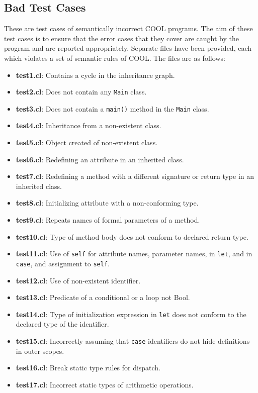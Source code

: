 \documentclass{article}
\begin{document}
\subsection{Bad Test Cases}
These are test cases of semantically incorrect COOL programs. The aim of these test cases is to ensure that the error cases that they cover are caught by the program and are reported appropriately. Separate files have been provided, each which violates a set of semantic rules of COOL. The files are as follows:
\begin{itemize}
	\item \textbf{test1.cl}: Contains a cycle in the inheritance graph.
	\item \textbf{test2.cl}: Does not contain any \verb|Main| class.
	\item \textbf{test3.cl}: Does not contain a \verb|main()| method in the \verb|Main| class.
	\item \textbf{test4.cl}: Inheritance from a non-existent class.
	\item \textbf{test5.cl}: Object created of non-existent class.
	\item \textbf{test6.cl}: Redefining an attribute in an inherited class.
	\item \textbf{test7.cl}: Redefining a method with a different signature or return type in an inherited class.
	\item \textbf{test8.cl}: Initializing attribute with a non-conforming type.
	\item \textbf{test9.cl}: Repeats names of formal parameters of a method.
	\item \textbf{test10.cl}: Type of method body does not conform to declared return type.
	\item \textbf{test11.cl}: Use of \verb|self| for attribute names, parameter names, in \verb|let|, and in \verb|case|, and assignment to \verb|self|.
	\item \textbf{test12.cl}: Use of non-existent identifier.
	\item \textbf{test13.cl}: Predicate of a conditional or a loop not Bool.
	\item \textbf{test14.cl}: Type of initialization expression in \verb|let| does not conform to the declared type of the identifier.
	\item \textbf{test15.cl}: Incorrectly assuming that \verb|case| identifiers do not hide definitions in outer scopes.
	\item \textbf{test16.cl}: Break static type rules for dispatch.
	\item \textbf{test17.cl}: Incorrect static types of arithmetic operations.

\end{itemize}
\end{document}
